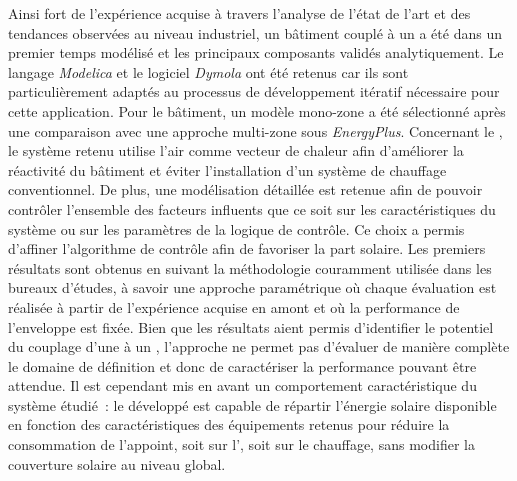 Ainsi fort de l’expérience acquise à travers l’analyse de l’état de l’art et des tendances
observées au niveau industriel, un bâtiment couplé à un  a été dans un premier temps
modélisé et les principaux composants validés analytiquement. Le langage \textit{Modelica}
et le logiciel \textit{Dymola} ont été retenus car ils sont particulièrement adaptés au
processus de développement itératif nécessaire pour cette application. Pour le bâtiment,
un modèle mono-zone a été sélectionné après une comparaison avec une approche multi-zone
sous \textit{EnergyPlus}. Concernant le , le système retenu utilise l’air
comme vecteur de chaleur afin d’améliorer la réactivité du bâtiment et éviter
l’installation d’un système de chauffage conventionnel. De plus, une modélisation détaillée
est retenue afin de pouvoir contrôler l’ensemble des facteurs
influents que ce soit sur les caractéristiques du système ou sur les paramètres de la
logique de contrôle. Ce choix a permis d’affiner l’algorithme de contrôle afin de
favoriser la part solaire. Les
premiers résultats sont obtenus en suivant la méthodologie couramment utilisée dans les
bureaux d’études, à savoir une approche paramétrique où chaque évaluation est réalisée
à partir de l’expérience acquise en amont et où la performance de l’enveloppe est fixée. Bien que les
résultats aient permis d’identifier le potentiel du couplage d’une  à un
, l’approche ne permet pas d’évaluer de manière complète le domaine de
définition et donc de caractériser la performance pouvant être attendue.
Il est cependant mis en avant
un comportement caractéristique du système étudié~: le  développé est capable de
répartir l’énergie solaire disponible en fonction des caractéristiques des équipements
retenus pour réduire la consommation de l’appoint, soit sur l’, soit sur le chauffage,
sans modifier la couverture solaire au niveau global.


